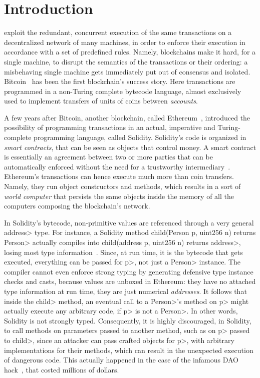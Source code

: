 \section{Introduction}\label{sec:introduction}

 exploit the redundant, concurrent execution of the same
transactions on a decentralized network of many machines,
in order to enforce their execution in accordance with
a set of predefined rules. Namely, blockchains make it hard, for a single machine,
to disrupt the semantics of the transactions or their ordering: a misbehaving single machine
gets immediately put out of consensus and isolated. Bitcoin~\cite{Nakamoto08,book-mastering-bitcoin}
has been the first blockchain's success story. Here
transactions are programmed in a non-Turing complete bytecode language,
almost exclusively used to implement transfers of units of coins between \emph{accounts}.

A few years after Bitcoin, another blockchain, called
Ethereum~\cite{Buterin13,AntonopoulosW18}, introduced the possibility of programming
transactions in an actual, imperative and Turing-complete programming language, called Solidity.
Solidity's code is organized in \emph{smart contracts}, that can be seen as
objects that control money. A smart contract is essentially an agreement between two or more parties that can be automatically enforced without the need for a trustworthy intermediary~\cite{ebp}.
Ethereum's transactions can hence execute much more than coin transfers. Namely,
they run object constructors and methods, which results in a sort
of \emph{world computer} that persists the same objects inside the memory of all the
computers composing the blockchain's network.

In Solidity's bytecode,
non-primitive values are referenced through a very general
\<address> type. For instance, a Solidity method
\<child(Person p, uint256 n) returns Person> actually compiles
into \<child(address p, uint256 n) returns address>, losing most
type information~\cite{CrafaPZ19}.
Since, at run time, it is the bytecode that gets executed,
everything can be passed for \<p>, not just a \<Person> instance.
The compiler cannot even enforce strong typing
by generating defensive type instance checks and casts, because
values are unboxed in Ethereum: they have no attached
type information at run time,
they are just numerical \emph{addresses}.
It follows that inside the \<child> method, an eventual call to a \<Person>'s method
on \<p> might actually execute any arbitrary code, if \<p> is not a \<Person>.
In other words, Solidity is not strongly typed.
Consequently, it is highly discouraged, in Solidity, to call methods on parameters passed
to another method, such as on \<p> passed to \<child>, since an attacker can pass crafted
objects for \<p>, with arbitrary implementations for their methods,
which can result in the unexpected execution of
dangerous code. This actually happened in the case of the infamous DAO hack~\cite{dao16}, that
costed millions of dollars.

